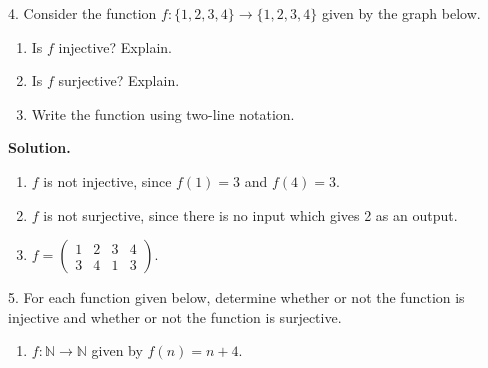 \documentclass[10pt,]{book}
\theoremstyle{plain}
\theoremstyle{definition}
\theoremstyle{definition}
\theoremstyle{definition}
\numberwithin{equation}{section}
\def\N{\mathbb N}
\newcommand{\amp}{ & }
\begin{document}
\begin{exerciselist}
\begin{enumerate}[label=(\alph*)]
\end{enumerate}
\item[4.]\hypertarget{exercise-30}{}
            Consider the function \(f:\{1,2,3,4\} \to \{1,2,3,4\}\) given by the graph below.
\leavevmode%
\begin{figure}
\centering
{
}
\end{figure}
\leavevmode%
\begin{enumerate}[label=(\alph*)]
\item\hypertarget{li-307}{}
                Is \(f\) injective? Explain.
\item\hypertarget{li-308}{}
                Is \(f\) surjective? Explain.
\item\hypertarget{li-309}{}
                Write the function using two-line notation.
\end{enumerate}
\par\smallskip
\par\smallskip
\noindent\textbf{Solution.}\hypertarget{solution-48}{}\quad
\leavevmode%
\begin{enumerate}[label=(\alph*)]
\item\hypertarget{li-310}{}\(f\) is not injective, since \(f(1) = 3\) and \(f(4) = 3\).%
\item\hypertarget{li-311}{}\(f\) is not surjective, since there is no input which gives 2 as an output.%
\item\hypertarget{li-312}{}\(f=\begin{pmatrix} 1 \amp 2 \amp 3 \amp 4 \\ 3 \amp 4 \amp 1 \amp 3\end{pmatrix}\).%
\end{enumerate}
\item[5.]\hypertarget{exercise-31}{}
            For each function given below, determine whether or not the function is injective and whether or not the function is surjective.
\leavevmode%
\begin{enumerate}[label=(\alph*)]
\item\hypertarget{li-313}{}\(f:\N \to \N\) given by \(f(n) = n+4\).%

\end{enumerate}
\end{exerciselist}
\end{document}
